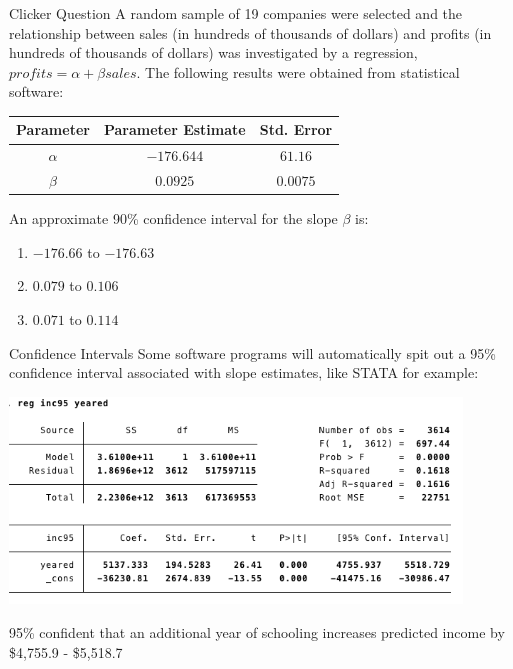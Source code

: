 \documentclass{beamer}
\begin{document}
\begin{frame}{Clicker Question}
	\small{A random sample of 19 companies were selected and the relationship between sales (in hundreds of thousands of dollars) and profits (in hundreds of thousands of dollars) was investigated by a regression, $profits = \alpha + \beta sales$. The following results were obtained from statistical software:}
	
	\begin{center}
		
			\begin{tabular}{|c|c|c|}
				\hline
				\textbf{Parameter} & \textbf{Parameter Estimate} & \textbf{Std. Error} \\
				\hline
				$\alpha$ & $-176.644$ & $61.16$    \\
				\hline
				$\beta$ & $0.0925$ & $0.0075$   \\
				\hline
			\end{tabular}
		
	\end{center}
	
	\small{ An approximate 90\% confidence interval for the slope $\beta$ is: }

	\begin{enumerate}[label=(\alph*)]
		\item $-176.66$ to $-176.63$
		\item $0.079$ to $0.106$
		\item $0.071$ to $0.114$
	\end{enumerate}
\end{frame}

\begin{frame}{Confidence Intervals}
	Some software programs will automatically spit out a 95\% confidence interval associated with slope estimates, like STATA for example:

	\begin{center}
		\includegraphics[width=0.9\textwidth]{stata_output}
	\end{center}
	
	95\% confident that an additional year of schooling increases predicted income by \$4,755.9 - \$5,518.7
\end{frame}
\end{document}
